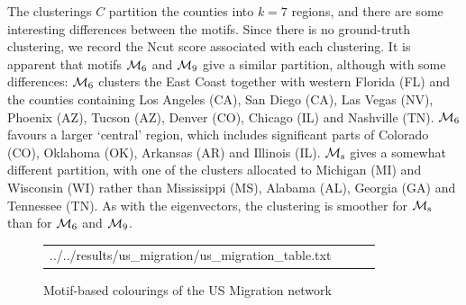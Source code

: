 The clusterings $C$ partition the counties into $k=7$ regions, and there are some interesting differences between the motifs.
Since there is no ground-truth clustering, we record the Ncut score associated with each clustering.
It is apparent that motifs $\mathcal{M}_6$ and $\mathcal{M}_9$ give a similar partition, although with some differences:
$\mathcal{M}_6$ clusters the East Coast together with western Florida (FL) and the counties containing Los Angeles (CA), San Diego (CA), Las Vegas (NV), Phoenix (AZ), Tucson (AZ), Denver (CO), Chicago (IL) and Nashville (TN).
$\mathcal{M}_6$ favours a larger `central' region, which includes significant parts of Colorado (CO), Oklahoma (OK), Arkansas (AR) and Illinois (IL).
$\mathcal{M}_\mathrm{s}$ gives a somewhat different partition, with one of the clusters allocated to Michigan (MI) and Wisconsin (WI) rather than Mississippi (MS), Alabama (AL), Georgia (GA) and Tennessee (TN). As with the eigenvectors, the clustering is smoother for $\mathcal{M}_\mathrm{s}$ than for $\mathcal{M}_6$ and $\mathcal{M}_9$.





\pagebreak

\vspace*{-1cm}
\begin{figure}[H]
	\begin{table}[H]
		\centering
		\setlength{\tabcolsep}{0em}
		\begin{tabular}{ |c|c|c|c| }
			\expandableinput ../../results/us_migration/us_migration_table.txt
		\end{tabular}
	\end{table}
	\vspace*{-0.5cm}
	\caption{Motif-based colourings of the US Migration network}
	\label{fig:us_migration}
\end{figure}
